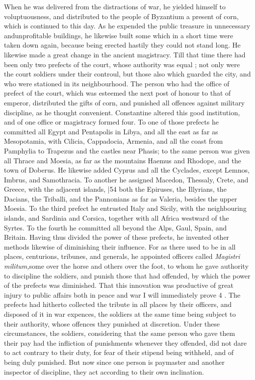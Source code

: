 When he was delivered from the distractions of war, he yielded himself to voluptuousness, and distributed to the people of Byzantium a present of corn, which is continued to this day. As he expended the public treasure in unnecessary and\emph{}unprofitable buildings, he likewise built some which in a short time were taken down again, because being erected hastily they could not stand long. He likewise made a great change in the ancient magistracy. Till that time there had been only two prefects of the court, whose authority was equal ; not only were the court soldiers under their controul, but those also which guarded the city, and who were stationed in its neighbourhood. The person who had the office of prefect of the court, which was esteemed the next post of honour to that of emperor, distributed the gifts of corn, and punished all offences against military discipline, as he thought convenient. Constantine altered this good institution, and of one office or magistracy formed four. To one of those prefects he committed all Egypt and Pentapolis in Libya, and all the east as far as Mesopotamia, with Cilicia, Cappadocia, Armenia, and all the coast from Pamphylia to Trapezus and the castles near Phasis; to the same person was given all Thrace and Moesia, as far as the mountains Haemus and Rhodope, and the town of Doberus. He likewise added Cyprus and all the Cyclades, except Lemnos, Imbrus, and Samothracia. To another he assigned Macedon, Thessaly, Crete, and Greece, with the adjacent islands,
|54 both the Epiruses, the Illyrians, the Dacians, the Triballi, and the Pannonians as far as Valeria, besides the upper Moesia. To the third prefect he entrusted Italy and Sicily, with the neighbouring islands, and Sardinia and Corsica, together with all Africa westward of the Syrtes. To the fourth he committed all beyond the Alps, Gaul, Spain, and Britain. Having thus divided the power of these prefects, he invented other methods likewise of diminishing their influence. For as there used to be in all places, centurions, tribunes, and generals, he appointed officers called \emph{Magistri militum,}some over the horse and others over the foot, to whom he gave authority to discipline the soldiers, and punish those that had offended, by which the power of the prefects was diminished. That this innovation was productive of great injury to public affairs both in peace and war I will immediately
prove 4 . The prefects had hitherto collected the tribute in all places by their officers, and disposed of it in war expences, the soldiers at the same time being subject to their authority, whose offences they punished at discretion. Under these circumstances, the soldiers, considering that the same person who gave them their pay had the infliction of punishments whenever they offended, did not dare to act contrary to their duty, for fear of their stipend being withheld, and of being duly punished. But now since one person is paymaster and another inspector of discipline, they act according to their own inclination.

